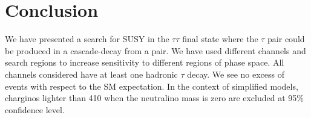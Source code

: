 \section{Conclusion}
\label{sect:conclusion}
We have presented a search for SUSY in the $\tau\tau$ final state where the
$\tau$ pair could be produced in a cascade-decay from a \PSGcpDo pair.
We have used different channels and search regions to increase sensitivity to
different regions of phase space. 
All channels considered have at least one hadronic $\tau$ decay.
We see no excess of events with respect to the SM expectation.
In the context of simplified models, charginos lighter than 410 \GeV when the neutralino mass is zero
are excluded at 95\% confidence level.

